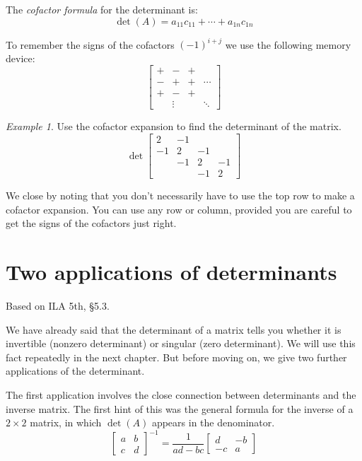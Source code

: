 \documentclass[11pt,oneside]{amsbook}
\theoremstyle{definition}
\theoremstyle{plain}
\theoremstyle{definition}
\theoremstyle{remark}
\newtheorem{example}[theorem]{Example}
\numberwithin{equation}{section}
\numberwithin{figure}{section}
\begin{document}
The \emph{cofactor formula} for the determinant is:
\[\det(A)=a_{11}c_{11}+\cdots+a_{1n}c_{1n}
\]

To remember the signs of the cofactors $(-1)^{i+j}$ we use the following memory device:
\[\begin{bmatrix}
    +&-&+\\-&+&+&\cdots\\+&-&+\\&\vdots&&\ddots
  \end{bmatrix}
\]

\begin{example}
  Use the cofactor expansion to find the determinant of the matrix.
  \[\det\begin{bmatrix}
    2&-1\\-1&2&-1\\&-1&2&-1\\&&-1&2
  \end{bmatrix}
  \]
\end{example}

We close by noting that you don't necessarily have to use the top row to make a cofactor expansion. You can use any row or column, provided you are careful to get the signs of the cofactors just right.


\newpage
\section{Two applications of determinants}

Based on ILA 5th, \S 5.3.

We have already said that the determinant of a matrix tells you whether it is invertible (nonzero determinant) or singular (zero determinant). We will use this fact repeatedly in the next chapter. But before moving on, we give two further applications of the determinant.

The first application involves the close connection between determinants and the inverse matrix. The first hint of this was the general formula for the inverse of a $2\times 2$ matrix, in which $\det(A)$ appears in the denominator.
\[\begin{bmatrix}a&b\\c&d\end{bmatrix}^{-1}
  =\frac{1}{ad-bc}\begin{bmatrix}d&-b\\-c&a\end{bmatrix}
\]
\end{document}
